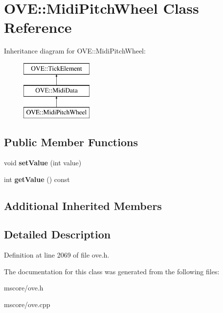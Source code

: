 \hypertarget{class_o_v_e_1_1_midi_pitch_wheel}{}\section{O\+VE\+:\+:Midi\+Pitch\+Wheel Class Reference}
\label{class_o_v_e_1_1_midi_pitch_wheel}
Inheritance diagram for O\+VE\+:\+:Midi\+Pitch\+Wheel\+:\begin{figure}[H]
\begin{center}
\leavevmode
\includegraphics[height=3.000000cm]{class_o_v_e_1_1_midi_pitch_wheel}
\end{center}
\end{figure}
\subsection*{Public Member Functions}
\begin{DoxyCompactItemize}
\item 
\mbox{\label{class_o_v_e_1_1_midi_pitch_wheel_af2ae7ed67aceda472ac227a32f775da8}} 
void {\bfseries set\+Value} (int value)
\item 
\mbox{\label{class_o_v_e_1_1_midi_pitch_wheel_a9fb4b59e87bcf418f38f08e183bed0f5}} 
int {\bfseries get\+Value} () const
\end{DoxyCompactItemize}
\subsection*{Additional Inherited Members}


\subsection{Detailed Description}


Definition at line 2069 of file ove.\+h.



The documentation for this class was generated from the following files\+:\begin{DoxyCompactItemize}
\item 
mscore/ove.\+h\item 
mscore/ove.\+cpp\end{DoxyCompactItemize}

